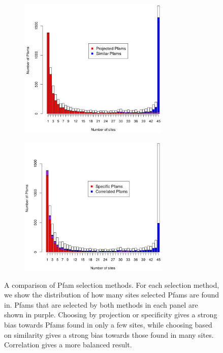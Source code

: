 \begin{figure}[!ht]
\centering
    \begin{subfigure}[t]{2.8in}
        \includegraphics[width=2.8in]{NMF/figures/figS6a}
    \end{subfigure}
    \begin{subfigure}[t]{2.8in}
        \includegraphics[width=2.8in]{NMF/figures/figS6b}
    \end{subfigure} 
 \caption{A comparison of Pfam selection methods.  For each selection method, we show the distribution of how many sites selected Pfams are found in.  Pfams that are selected by both methods in each panel are shown in purple.  Choosing by projection or specificity gives a strong bias towards Pfams found in only a few sites, while choosing based on similarity gives a strong bias towards those found in many sites.  Correlation gives a more balanced result.}
 \label{sitedist}
\end{figure}

